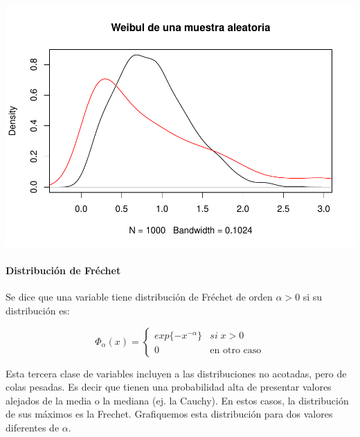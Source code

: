 \documentclass[
  12pt]{article}
\begin{document}
\includegraphics{extremales_files/figure-latex/unnamed-chunk-18-1.pdf}

\hypertarget{distribuciuxf3n-de-fruxe9chet}{%
\paragraph{Distribución de
Fréchet}\label{distribuciuxf3n-de-fruxe9chet}}

Se dice que una variable tiene distribución de Fréchet de orden
\(\alpha>0\) si su distribución es:

\[
\Phi_{\alpha}(x)=\begin{cases}
exp\{-x^{-\alpha}\} & si\;x>0\\
0 & \text{en otro caso}
\end{cases}
\]

Esta tercera clase de variables incluyen a las distribuciones no
acotadas, pero de colas pesadas. Es decir que tienen una probabilidad
alta de presentar valores alejados de la media o la mediana (ej. la
Cauchy). En estos casos, la distribución de sus máximos es la Frechet.
Grafiquemos esta distribución para dos valores diferentes de \(\alpha\).
\end{document}

